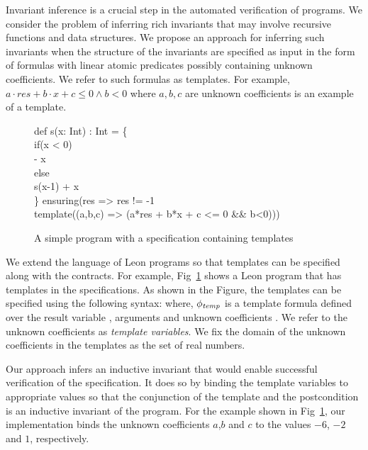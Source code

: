 \documentclass[a4paper,10pt]{article}
\begin{document}
Invariant inference is a crucial step in the automated verification of programs. 
We consider the problem of inferring rich invariants that may involve recursive functions and data structures.
We propose an approach for inferring such invariants when the structure of the invariants are specified as input in the form of formulas with linear atomic predicates possibly containing unknown coefficients.
We refer to such formulas as templates. For example, $a \cdot res + b \cdot x + c \le 0 \wedge b < 0$ where
$a,b,c$ are unknown coefficients is an example of a template.
%
\begin{figure}
\begin{myprogram}
\pnl \> def s(x: Int) : Int = \{ \\
\pnl \> \> if(x < 0) \\
\pnl \> \> \> - x \\
\pnl \> \> else  \\
\pnl \> \> \> 	s(x-1) + x\\
\pnl \> \} ensuring(res => res != -1  \\
\pnl \> \> \> template((a,b,c) => (a*res + b*x + c <= 0 \&\& b<0)))
\end{myprogram}
\caption{A simple program with a specification containing templates} \label{fig:eg}
\end{figure}

We extend the language of Leon programs so that templates can be specified along with the contracts. 
For example, Fig~\ref{fig:eg} shows a Leon program that has templates in the specifications. 
As shown in the Figure, the templates can be specified using the following syntax: 
 where, $\mathit{\phi_{temp}}$ is a template formula
defined over the result variable , arguments and unknown coefficients .
We refer to the unknown coefficients as \emph{template variables}.
We fix the domain of the unknown coefficients in the templates as the set of real numbers.

Our approach infers an inductive invariant that would enable successful verification of the specification.
It does so by binding the template variables to appropriate values so that the conjunction of the template and
the postcondition is an inductive invariant of the program.
For the example shown in Fig~\ref{fig:eg}, our implementation binds the unknown coefficients $a$,$b$ and $c$ to 
the values $-6$, $-2$ and $1$, respectively.
\end{document}
